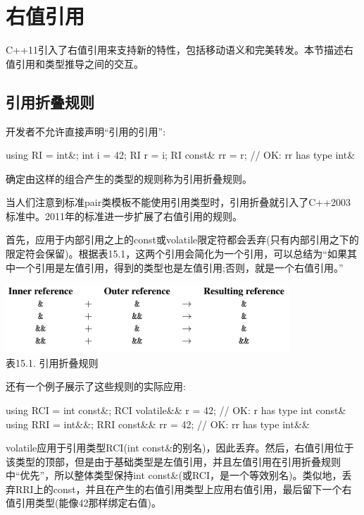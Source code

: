 \section{右值引用}

C++11引入了右值引用来支持新的特性，包括移动语义和完美转发。本节描述右值引用和类型推导之间的交互。

\subsection{引用折叠规则}

开发者不允许直接声明“引用的引用”:

\begin{cpp}
using RI = int&;
int i = 42;
RI r = i;
RI const& rr = r; // OK: rr has type int&
\end{cpp}

确定由这样的组合产生的类型的规则称为引用折叠规则。

\begin{notice}
当人们注意到标准pair类模板不能使用引用类型时，引用折叠就引入了C++2003标准中。2011年的标准进一步扩展了右值引用的规则。
\end{notice}

首先，应用于内部引用之上的const或volatile限定符都会丢弃(只有内部引用之下的限定符会保留)。根据表15.1，这两个引用会简化为一个引用，可以总结为“如果其中一个引用是左值引用，得到的类型也是左值引用;否则，就是一个右值引用。”

\begin{center}
\includegraphics[width=0.8\textwidth]{part2/ch15/images/1.png} \\
表15.1. 引用折叠规则
\end{center}

还有一个例子展示了这些规则的实际应用:

\begin{cpp}
using RCI = int const&;
RCI volatile&& r = 42; // OK: r has type int const&
using RRI = int&&;
RRI const&& rr = 42; // OK: rr has type int&&
\end{cpp}

volatile应用于引用类型RCI(int const\&的别名)，因此丢弃。然后，右值引用位于该类型的顶部，但是由于基础类型是左值引用，并且左值引用在引用折叠规则中“优先”，所以整体类型保持int const\&(或RCI，是一个等效别名)。类似地，丢弃RRI上的const，并且在产生的右值引用类型上应用右值引用，最后留下一个右值引用类型(能像42那样绑定右值)。


